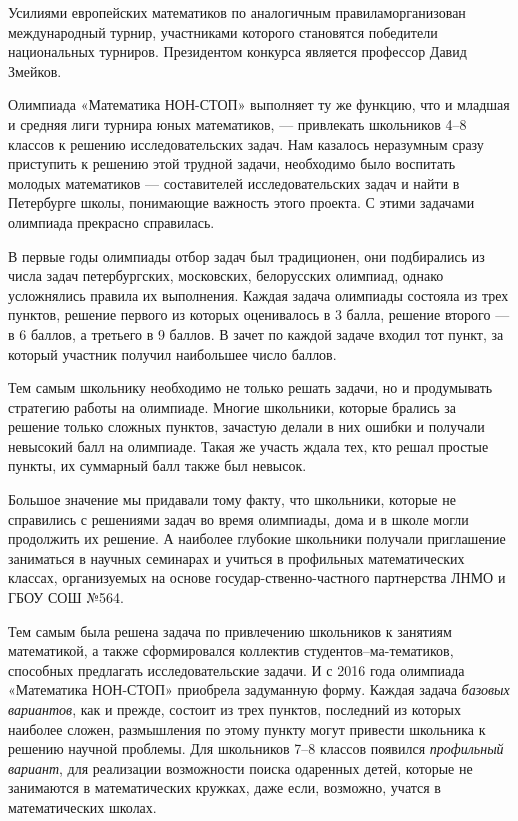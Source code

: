 \ms\abz Усилиями европейских математиков по аналогичным правилам\linebreak организован международный турнир, участниками которого становятся победители национальных турниров. Президентом конкурса является профессор Давид Змейков.  

\ms\abz Олимпиада «Математика НОН-СТОП» выполняет ту же функцию, что и младшая и средняя лиги турнира юных математиков, — привлекать школьников 4–8 классов к решению исследовательских задач. Нам казалось неразумным сразу приступить к решению этой трудной задачи, необходимо было воспитать молодых математиков — составителей  исследовательских задач и найти в Петербурге школы, понимающие важность этого проекта. С этими задачами олимпиада прекрасно справилась.

\ms\abz В первые годы олимпиады отбор задач был традиционен, они подбирались из числа задач петербургских, московских, белорусских олимпиад, однако усложнялись правила их выполнения. Каждая задача олимпиады состояла из трех пунктов, решение первого из которых оценивалось в 3 балла, решение второго — в 6 баллов, а третьего в 9 баллов. В зачет по каждой задаче входил тот пункт, за который участник получил наибольшее число баллов.

\ms\abz Тем самым школьнику необходимо не только решать задачи, но и продумывать стратегию работы на олимпиаде. Многие школьники, которые брались за решение только сложных пунктов, зачастую делали в них ошибки и получали невысокий балл на олимпиаде. Такая же участь ждала тех, кто решал простые пункты, их суммарный балл также был невысок.

\ms\abz Большое значение мы придавали тому факту, что школьники, которые не справились с решениями задач во время олимпиады, дома и в школе могли продолжить их решение. А наиболее глубокие школьники получали приглашение заниматься в научных семинарах и учиться в профильных математических классах, организуемых на основе государ-\linebreak ственно-частного партнерства ЛНМО и ГБОУ СОШ №564.

\ms\abz Тем самым была решена задача по привлечению школьников к занятиям математикой, а также сформировался коллектив студентов–ма-\linebreak тематиков, способных предлагать исследовательские задачи. И с 2016 года олимпиада «Математика НОН-СТОП» приобрела задуманную форму. Каждая задача {\itshape базовых вариантов}, как и прежде, состоит из трех пунктов, последний из которых наиболее сложен, размышления по этому пункту могут привести школьника к решению научной проблемы. Для школьников 7–8 классов появился {\itshape профильный вариант}, для реализации возможности поиска одаренных детей, которые не занимаются в математических кружках, даже если, возможно, учатся в математических школах.

